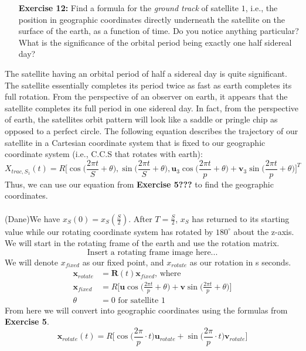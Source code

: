 \documentclass[11pt]{article}
\theoremstyle{definition}
\newcommand{\1}[1]{\mathbf{1} \left \{ #1 \right \}}
\begin{document}
\begin{itemize}
\item[{\textbf{Exercise 12:}}] Find a formula for the \textit{ground track} of satellite $1$, i.e., the position in geographic coordinates directly underneath the satellite on the surface of the earth, as a function of time.  Do you notice anything particular?  What is the significance of the orbital period being exactly one half sidereal day?
\end{itemize}
The satellite having an orbital period of half a sidereal day is quite significant.  The satellite essentially completes its period twice as fast as earth completes its full rotation.  From the perspective of an observer on earth, it appears that the satellite completes its full period in one sidereal day.
In fact, from the perspective of earth, the satellites orbit pattern will look like a saddle or pringle chip as opposed to a perfect circle.  The following equation describes the trajectory of our satellite in a Cartesian coordinate system that is fixed to our geographic coordinate system (i.e., C.C.S that rotates with earth):
\begin{equation}
   X_{trac,S_1} (t) = R \Bigg[\cos \bigg(\frac{2\pi t}{S} + \theta \bigg), \sin \bigg(\frac{2\pi t}{S} + \theta \bigg), \textbf{u}_3\cos \bigg(\frac{2\pi t}{p} + \theta \bigg) + \textbf{v}_3\sin \bigg(\frac{2\pi t}{p} + \theta \bigg)\Bigg]^T
\end{equation}
Thus, we can use our equation from \textbf{Exercise 5???} to find the geographic coordinates.
\\
\\
(Dane)We have \(x_S (0) = x_S (\frac{S}{2})\).  After $T = \frac{S}{2}$, $x_S$ has returned to its starting value while our rotating coordinate system has rotated by $180^{\circ}$ about the z-axis.  We will start in the rotating frame of the earth and use the rotation matrix.
\[\text{Insert a rotating frame image here...}\]
We will denote $x_{fixed}$ as our fixed point, and $x_{rotate}$ as our rotation in s seconds.
\begin{align*}
    \textbf{x}_{rotate} &= \textbf{R}(t)\textbf{x}_{fixed} \text{, where} \\
    \textbf{x}_{fixed} &= R\Bigg[\textbf{u}\cos \bigg(\frac{2\pi t}{p} + \theta \bigg) + \textbf{v}\sin \bigg(\frac{2\pi t}{p} + \theta \bigg)\Bigg] \\
    \theta &= 0 \text{ for satellite 1}
\end{align*}
From here we will convert into geographic coordinates using the formulas from \textbf{Exercise 5}.
\[\textbf{x}_{rotate} (t) = R\Bigg[\cos \bigg(\frac{2\pi}{p} \cdot t \bigg)\textbf{u}_{rotate} + \sin \bigg(\frac{2\pi}{p} \cdot t \bigg)\textbf{v}_{rotate} \Bigg]\]
\end{document}
